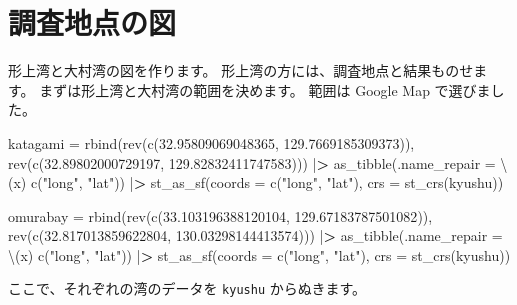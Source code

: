 \documentclass[
]{book}
\newenvironment{Shaded}{\begin{snugshade}}{\end{snugshade}}
\newcommand{\AttributeTok}[1]{\textcolor[rgb]{0.77,0.63,0.00}{#1}}
\newcommand{\ErrorTok}[1]{\textcolor[rgb]{0.64,0.00,0.00}{\textbf{#1}}}
\newcommand{\FloatTok}[1]{\textcolor[rgb]{0.00,0.00,0.81}{#1}}
\newcommand{\FunctionTok}[1]{\textcolor[rgb]{0.00,0.00,0.00}{#1}}
\newcommand{\NormalTok}[1]{#1}
\newcommand{\OtherTok}[1]{\textcolor[rgb]{0.56,0.35,0.01}{#1}}
\newcommand{\SpecialCharTok}[1]{\textcolor[rgb]{0.00,0.00,0.00}{#1}}
\newcommand{\StringTok}[1]{\textcolor[rgb]{0.31,0.60,0.02}{#1}}
\theoremstyle{definition}
\theoremstyle{definition}
\theoremstyle{definition}
\theoremstyle{definition}
\theoremstyle{remark}
\begin{document}
\hypertarget{ux8abfux67fbux5730ux70b9ux306eux56f3}{%
\section{調査地点の図}\label{ux8abfux67fbux5730ux70b9ux306eux56f3}}

形上湾と大村湾の図を作ります。
形上湾の方には、調査地点と結果ものせます。
まずは形上湾と大村湾の範囲を決めます。
範囲は Google Map で選びました。

\begin{Shaded}
\begin{Highlighting}[]
\NormalTok{katagami }\OtherTok{=} \FunctionTok{rbind}\NormalTok{(}\FunctionTok{rev}\NormalTok{(}\FunctionTok{c}\NormalTok{(}\FloatTok{32.95809069048365}\NormalTok{, }\FloatTok{129.7669185309373}\NormalTok{)),}
                 \FunctionTok{rev}\NormalTok{(}\FunctionTok{c}\NormalTok{(}\FloatTok{32.89802000729197}\NormalTok{, }\FloatTok{129.82832411747583}\NormalTok{))) }\SpecialCharTok{|}\ErrorTok{\textgreater{}}
  \FunctionTok{as\_tibble}\NormalTok{(}\AttributeTok{.name\_repair =}\NormalTok{ \textbackslash{}(x) }\FunctionTok{c}\NormalTok{(}\StringTok{"long"}\NormalTok{, }\StringTok{"lat"}\NormalTok{)) }\SpecialCharTok{|}\ErrorTok{\textgreater{}}
  \FunctionTok{st\_as\_sf}\NormalTok{(}\AttributeTok{coords =} \FunctionTok{c}\NormalTok{(}\StringTok{"long"}\NormalTok{, }\StringTok{"lat"}\NormalTok{), }\AttributeTok{crs =} \FunctionTok{st\_crs}\NormalTok{(kyushu))}

\NormalTok{omurabay }\OtherTok{=} \FunctionTok{rbind}\NormalTok{(}\FunctionTok{rev}\NormalTok{(}\FunctionTok{c}\NormalTok{(}\FloatTok{33.103196388120104}\NormalTok{, }\FloatTok{129.67183787501082}\NormalTok{)),}
                 \FunctionTok{rev}\NormalTok{(}\FunctionTok{c}\NormalTok{(}\FloatTok{32.817013859622804}\NormalTok{, }\FloatTok{130.03298144413574}\NormalTok{))) }\SpecialCharTok{|}\ErrorTok{\textgreater{}} 
  \FunctionTok{as\_tibble}\NormalTok{(}\AttributeTok{.name\_repair =}\NormalTok{ \textbackslash{}(x) }\FunctionTok{c}\NormalTok{(}\StringTok{"long"}\NormalTok{, }\StringTok{"lat"}\NormalTok{)) }\SpecialCharTok{|}\ErrorTok{\textgreater{}}
  \FunctionTok{st\_as\_sf}\NormalTok{(}\AttributeTok{coords =} \FunctionTok{c}\NormalTok{(}\StringTok{"long"}\NormalTok{, }\StringTok{"lat"}\NormalTok{), }\AttributeTok{crs =} \FunctionTok{st\_crs}\NormalTok{(kyushu))}
\end{Highlighting}
\end{Shaded}

ここで、それぞれの湾のデータを \texttt{kyushu} からぬきます。
\end{document}
